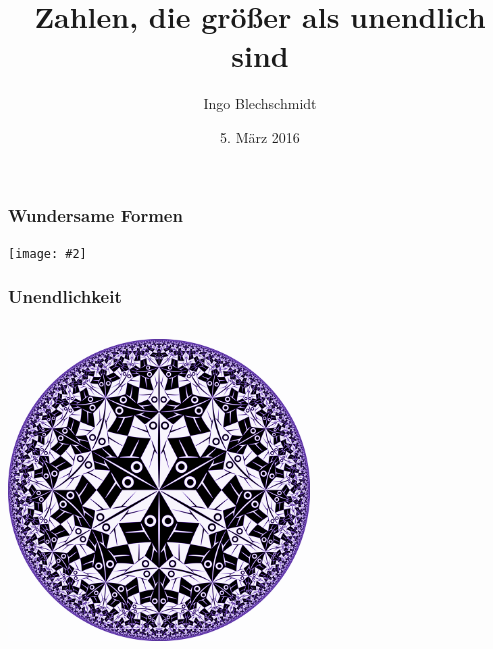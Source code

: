 \documentclass[12pt,utf8,notheorems,compress]{beamer}
\title{Zahlen, die größer als unendlich sind}
\author[Tag der Mathematik 2016]{Ingo Blechschmidt}
\date{5. März 2016}
\newcommand{\imgslide}[2]{
  \begin{frame}\frametitle{#1}
    \centering
    \texttt{[image: \#2]}
    \par
  \end{frame}
}
\begin{document}
\imgslide{Wundersame Formen}{mandelbrot}

\begin{frame}\frametitle{Unendlichkeit}
  \begin{columns}[c]
    \begin{column}{0.5\textwidth}
      \centering

      \includegraphics[width=0.6\textwidth]{infinity-circle}
      \bigskip


\end{column}
\end{columns}
\end{frame}
\end{document}
